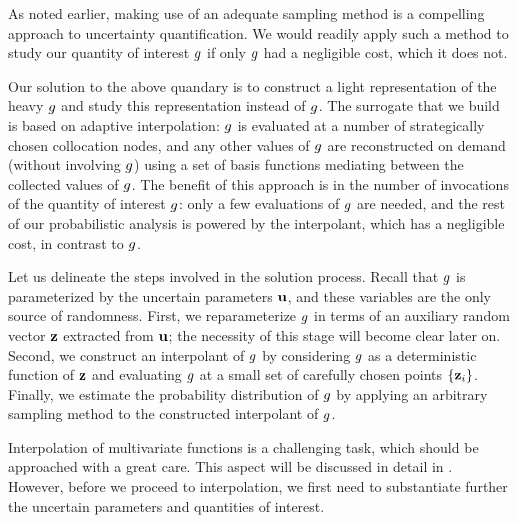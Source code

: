 As noted earlier, making use of an adequate sampling method is a compelling
approach to uncertainty quantification. We would readily apply such a method to
study our quantity of interest $g$ if only $g$ had a negligible cost, which it
does not.

Our solution to the above quandary is to construct a light representation of the
heavy $g$ and study this representation instead of $g$. The surrogate that we
build is based on adaptive interpolation: $g$ is evaluated at a number of
strategically chosen collocation nodes, and any other values of $g$ are
reconstructed on demand (without involving $g$) using a set of basis functions
mediating between the collected values of $g$. The benefit of this approach is
in the number of invocations of the quantity of interest $g$: only a few
evaluations of $g$ are needed, and the rest of our probabilistic analysis is
powered by the interpolant, which has a negligible cost, in contrast to $g$.

Let us delineate the steps involved in the solution process. Recall that $g$ is
parameterized by the uncertain parameters $\mathbf{u}$, and these variables are the
only source of randomness. First, we reparameterize $g$ in terms of an
auxiliary random vector $\mathbf{z}$ extracted from $\mathbf{u}$; the necessity of this stage
will become clear later on. Second, we construct an interpolant of $g$ by
considering $g$ as a deterministic function of $\mathbf{z}$ and evaluating $g$ at a
small set of carefully chosen points $\{ \mathbf{z}_i \}$. Finally, we estimate the
probability distribution of $g$ by applying an arbitrary sampling method to the
constructed interpolant of $g$.

Interpolation of multivariate functions is a challenging task, which should be
approached with a great care. This aspect will be discussed in detail in
. However, before we proceed to interpolation, we first need
to substantiate further the uncertain parameters and quantities of interest.
